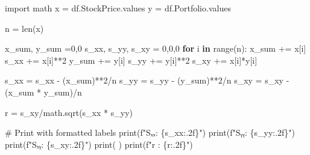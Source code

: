\documentclass[
  letterpaper,
  DIV=11,
  numbers=noendperiod]{scrartcl}
\newenvironment{Shaded}{\begin{snugshade}}{\end{snugshade}}
\newcommand{\BuiltInTok}[1]{\textcolor[rgb]{0.00,0.23,0.31}{#1}}
\newcommand{\CommentTok}[1]{\textcolor[rgb]{0.37,0.37,0.37}{#1}}
\newcommand{\ControlFlowTok}[1]{\textcolor[rgb]{0.00,0.23,0.31}{\textbf{#1}}}
\newcommand{\DecValTok}[1]{\textcolor[rgb]{0.68,0.00,0.00}{#1}}
\newcommand{\ImportTok}[1]{\textcolor[rgb]{0.00,0.46,0.62}{#1}}
\newcommand{\KeywordTok}[1]{\textcolor[rgb]{0.00,0.23,0.31}{\textbf{#1}}}
\newcommand{\NormalTok}[1]{\textcolor[rgb]{0.00,0.23,0.31}{#1}}
\newcommand{\OperatorTok}[1]{\textcolor[rgb]{0.37,0.37,0.37}{#1}}
\newcommand{\SpecialCharTok}[1]{\textcolor[rgb]{0.37,0.37,0.37}{#1}}
\newcommand{\SpecialStringTok}[1]{\textcolor[rgb]{0.13,0.47,0.30}{#1}}
\newcommand{\StringTok}[1]{\textcolor[rgb]{0.13,0.47,0.30}{#1}}
\begin{document}
\begin{Shaded}
\begin{Highlighting}[]
\ImportTok{import}\NormalTok{ math}
\NormalTok{x }\OperatorTok{=}\NormalTok{ df.StockPrice.values}
\NormalTok{y }\OperatorTok{=}\NormalTok{ df.Portfolio.values}

\NormalTok{n }\OperatorTok{=} \BuiltInTok{len}\NormalTok{(x)}

\NormalTok{x\_sum, y\_sum }\OperatorTok{=}\DecValTok{0}\NormalTok{,}\DecValTok{0}
\NormalTok{s\_xx, s\_yy, s\_xy }\OperatorTok{=} \DecValTok{0}\NormalTok{,}\DecValTok{0}\NormalTok{,}\DecValTok{0}
\ControlFlowTok{for}\NormalTok{ i }\KeywordTok{in} \BuiltInTok{range}\NormalTok{(n):}
\NormalTok{    x\_sum }\OperatorTok{+=}\NormalTok{ x[i]}
\NormalTok{    s\_xx }\OperatorTok{+=}\NormalTok{ x[i]}\OperatorTok{**}\DecValTok{2}
\NormalTok{    y\_sum }\OperatorTok{+=}\NormalTok{ y[i]}
\NormalTok{    s\_yy }\OperatorTok{+=}\NormalTok{ y[i]}\OperatorTok{**}\DecValTok{2}
\NormalTok{    s\_xy }\OperatorTok{+=}\NormalTok{ x[i]}\OperatorTok{*}\NormalTok{y[i]    }

\NormalTok{s\_xx }\OperatorTok{=}\NormalTok{ s\_xx }\OperatorTok{{-}}\NormalTok{ (x\_sum)}\OperatorTok{**}\DecValTok{2}\OperatorTok{/}\NormalTok{n}
\NormalTok{s\_yy }\OperatorTok{=}\NormalTok{ s\_yy }\OperatorTok{{-}}\NormalTok{ (y\_sum)}\OperatorTok{**}\DecValTok{2}\OperatorTok{/}\NormalTok{n}
\NormalTok{s\_xy }\OperatorTok{=}\NormalTok{ s\_xy }\OperatorTok{{-}}\NormalTok{ (x\_sum }\OperatorTok{*}\NormalTok{ y\_sum)}\OperatorTok{/}\NormalTok{n}

\NormalTok{r }\OperatorTok{=}\NormalTok{ s\_xy}\OperatorTok{/}\NormalTok{math.sqrt(s\_xx }\OperatorTok{*}\NormalTok{ s\_yy)}

\CommentTok{\# Print with formatted labels}
\BuiltInTok{print}\NormalTok{(}\SpecialStringTok{f"Sₓₓ: }\SpecialCharTok{\{}\NormalTok{s\_xx}\SpecialCharTok{:.2f\}}\SpecialStringTok{"}\NormalTok{)}
\BuiltInTok{print}\NormalTok{(}\SpecialStringTok{f"Sᵧᵧ: }\SpecialCharTok{\{}\NormalTok{s\_yy}\SpecialCharTok{:.2f\}}\SpecialStringTok{"}\NormalTok{)}
\BuiltInTok{print}\NormalTok{(}\SpecialStringTok{f"Sₓᵧ: }\SpecialCharTok{\{}\NormalTok{s\_xy}\SpecialCharTok{:.2f\}}\SpecialStringTok{"}\NormalTok{)}
\BuiltInTok{print}\NormalTok{(}\StringTok{\textquotesingle{} \textquotesingle{}}\NormalTok{)}
\BuiltInTok{print}\NormalTok{(}\SpecialStringTok{f"r : }\SpecialCharTok{\{}\NormalTok{r}\SpecialCharTok{:.2f\}}\SpecialStringTok{"}\NormalTok{)}
\end{Highlighting}
\end{Shaded}
\end{document}
